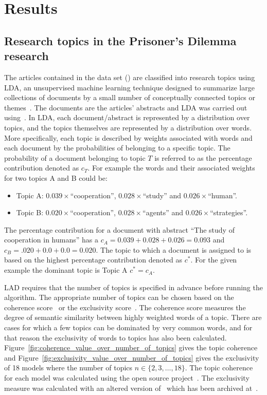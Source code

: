 \documentclass{article}
\theoremstyle{definition}
\begin{document}
\section{Results}\label{section:results}

\subsection{Research topics in the Prisoner's Dilemma research}\label{subsection:research_topics}

The articles contained in the data set (\citep{pd_data_2018}) are classified
into research topics using LDA, an unsupervised machine learning technique
designed to summarize large collections of documents by a small number of
conceptually connected topics or themes~\citep{Blei2003, Grimmer2013}. The
documents are the articles' abstracts and LDA was carried out using~\citep{rehurek_lrec}.
In LDA, each document/abstract is represented by a distribution over topics,
and the topics themselves are represented by a distribution over words. More
specifically, each topic is described by weights associated with words and
each document by the probabilities of belonging to a specific topic. The
probability of a document belonging to topic \(T\) is referred to as the percentage
contribution denoted as \(c_T\). For example the words and their associated
weights for two topics A and B could be:

\begin{itemize}
    \item Topic A: \(0.039 \times\)``cooperation'', \(0.028 \times\)``study'' and \(0.026 \times\)``human''.
    \item Topic B: \(0.020 \times\)``cooperation'', \(0.028 \times\)``agents'' and
    \(0.026 \times\)``strategies''.
\end{itemize}

The percentage contribution for a document with abstract ``The study of
cooperation in humans'' has a \(c_{A} = 0.039 + 0.028 + 0.026 = 0.093\) and
\(c_B = .020 + 0.0 + 0.0 = 0.020\). The topic to which a document is assigned to
is based on the highest percentage contribution denoted as \(c^*\). For the
given example the dominant topic is Topic A \(c^*=c_A\).

LAD requires that the number of topics is specified in advance before running
the algorithm. The appropriate number of topics can be chosen based on the
coherence score~\citep{Roder2015} or the exclusivity score~\citep{Airoldi2012}. The
coherence score measures the degree of semantic similarity between highly weighted
words of a topic. There are cases for which a few topics can be dominated by very
common words, and for that reason the exclusivity of words to topics has also
been calculated.
Figure~\ref{fig:coherence_value_over_number_of_topics} gives the topic coherence
and Figure~\ref{fig:exclusivity_value_over_number_of_topics} gives the
exclusivity of 18 models where the number of topics \(n \in \{2, 3, \dots, 18\}\).
The topic coherence for each model was calculated using the
open source project~\citep{rehurek_lrec}. The exclusivity measure was calculated
with an altered version of~\citep{rehurek_lrec} which has been archived
at~\citep{gensim_nikoleta}.
\end{document}
